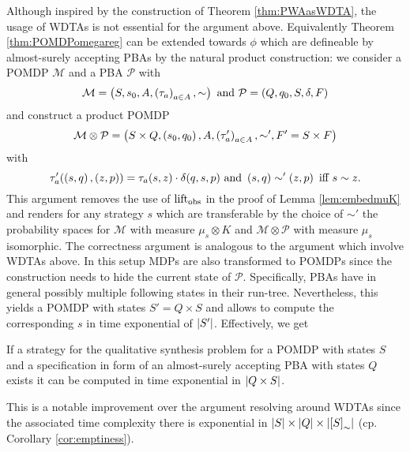 Although inspired by the construction of Theorem \ref{thm:PWAasWDTA}, the usage 
of \acp{WDTA} is not essential for the argument above. Equivalently Theorem
\ref{thm:POMDPomegareg} can be extended towards $\phi$ which
are defineable by almost-surely accepting \acp{PBA} by the natural product
construction: we consider a \ac{POMDP} $\mathcal{M}$ and a \ac{PBA}
$\mathcal{P}$ with
\begin{equation*}
  \mathcal{M} = \left(S, s_{0}, A, \left(\tau_{a}\right)_{a\in A}, \sim\right)
  \text{ and }
  \mathcal{P} = \left(Q, q_{0}, S, \delta, F\right)
\end{equation*}
and construct a product \ac{POMDP}
\begin{equation*}
  \mathcal{M}\otimes\mathcal{P} = \left(S\times Q, \left(s_{0}, q_{0}\right), A,
    \left(\tau'_{a}\right)_{a\in A}, \sim', F' = S\times F\right)
\end{equation*}
with
\begin{equation*}
  \tau'_{a}(\left(s, q\right), \left(z, p\right)) = \tau_{a}(s, z)\cdot\delta(q, s, p)
  \text{ and }
  \left(s, q\right)\sim'\left(z, p\right)\text{ iff }s\sim z.
\end{equation*}
This argument removes the use of $\operatorname{lift}_{\operatorname{obs}}$ in the proof of Lemma
\ref{lem:embedmuK} and renders for any strategy $s$ which are transferable by
the choice of $\sim'$ the probability spaces for $\mathcal{M}$ with measure
$\mu_{s}\otimes K$ and $\mathcal{M}\otimes\mathcal{P}$ with measure $\mu_{s}$
isomorphic. The correctness argument is analogous to the argument which involve
\acp{WDTA} above. In this setup \acp{MDP} are also transformed to \acp{POMDP}
since the construction needs to hide the current state of $\mathcal{P}$.
Specifically, \acp{PBA} have in general possibly multiple following states in
their run-tree. Nevertheless, this yields a \ac{POMDP} with
states $S' = Q\times S$ and allows to compute the corresponding $s$ in
time exponential of $\left\vert{S'}\right\vert$. Effectively, we get
\begin{corollary}
  If a strategy for the qualitative synthesis problem for a \ac{POMDP} with
  states $S$ and a specification in form of an almost-surely accepting \ac{PBA} 
  with states $Q$ exists it can be computed in time exponential in 
  $\left\vert{Q\times S}\right\vert$.
\end{corollary}
This is a notable improvement over the argument resolving around \acp{WDTA}
since the associated time complexity there is exponential in
$\left\vert{S}\right\vert\times\left\vert{Q}\right\vert\times\left\vert{\left[S\right]_{\sim}}\right\vert$ (cp. Corollary 
\ref{cor:emptiness}).
